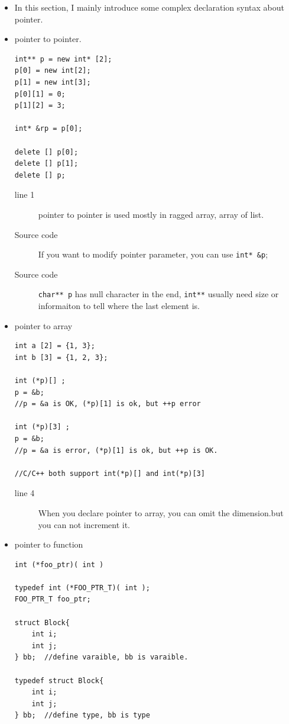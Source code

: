 \documentclass[a4paper,11pt,twoside]{book}
\begin{document}
\begin{itemize}	
		\item In this section, I mainly introduce some complex declaration syntax about pointer. 

	\item pointer to pointer.
\begin{lstlisting}
int** p = new int* [2];
p[0] = new int[2];
p[1] = new int[3];
p[0][1] = 0;
p[1][2] = 3;

int* &rp = p[0];

delete [] p[0];
delete [] p[1];
delete [] p;

\end{lstlisting}
\begin{description}
	\item[line 1] pointer to pointer is used mostly in ragged array, array of list. 
	\item[Source code] If you want to modify pointer parameter, you can use \texttt{int* \&p}; 
	\item[Source code] \texttt{char** p} has null character in the end, \texttt{int**} usually need size or informaiton to tell where the last element is.
\end{description}	
	
	\item pointer to array
\begin{lstlisting}
int a [2] = {1, 3};
int b [3] = {1, 2, 3};

int (*p)[] ;
p = &b;
//p = &a is OK, (*p)[1] is ok, but ++p error

int (*p)[3] ;
p = &b;
//p = &a is error, (*p)[1] is ok, but ++p is OK.

//C/C++ both support int(*p)[] and int(*p)[3]
\end{lstlisting}
\begin{description}
	\item[line 4] When you declare pointer to array, you can omit the dimension.but you can not increment it.
\end{description}

\item pointer to function
\begin{lstlisting}
int (*foo_ptr)( int )

typedef int (*FOO_PTR_T)( int );
FOO_PTR_T foo_ptr;

struct Block{
	int i;
	int j;
} bb;  //define varaible, bb is varaible.

typedef struct Block{
	int i;
	int j;
} bb;  //define type, bb is type 


\end{lstlisting}
\end{itemize}
\end{document}
